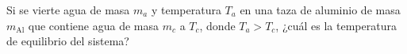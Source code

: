 \item Si se vierte agua de masa $m_a$ y temperatura $T_a$ en una taza de aluminio de masa $m_{\text{Al}}$ que contiene agua de masa $m_c$ a $T_c$, donde $T_a > T_c$, ¿cuál es la temperatura de equilibrio del sistema?
